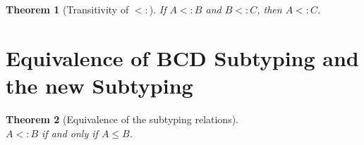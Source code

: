 \documentclass{article}
\newtheorem{theorem}{Theorem}
\begin{document}
\begin{theorem}[Transitivity of $<:$]\label{lem:sub-trans}
    If $A <: B$ and $B <: C$, then $A <: C$.
\end{theorem}

\section{Equivalence of BCD Subtyping and the new Subtyping}


\begin{theorem}[Equivalence of the subtyping relations]\ \\
  $A <: B$ if and only if $A ≤ B$.
\end{theorem}

\clearpage
\pagebreak



\end{document}
